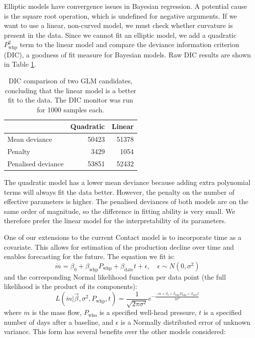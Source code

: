 \documentclass[a4paper, 12pt]{article}
\begin{document}
Elliptic models have convergence issues in Bayesian regression. A potential cause is the square root operation, which is undefined for negative arguments. If we want to use a linear, non-curved model, we must check whether curvature is present in the data. Since we cannot fit an elliptic model, we add a quadratic $P_\text{whp}^2$ term to the linear model and compare the deviance information criterion (DIC), a goodness of fit measure for Bayesian models. Raw DIC results are shown in Table \ref{tab:curvature}.

\begin{table}
\centering
\begin{tabular}{lrr}
  \hline
& Quadratic & Linear \\ 
  \hline
Mean deviance & 50423 & 51378 \\
Penalty & 3429 & 1054 \\
Penalised deviance & 53851 & 52432\\
   \hline
\end{tabular}
\caption{DIC comparison of two GLM candidates, concluding that the linear model is a better fit to the data. The DIC monitor was run for 1000 samples each.} 
\label{tab:curvature}
\end{table}

The quadratic model has a lower mean deviance because adding extra polynomial terms will always fit the data better. However, the penalty on the number of effective parameters is higher. The penalised deviances of both models are on the same order of magnitude, so the difference in fitting ability is very small. We therefore prefer the linear model for the interpretability of its parameters.

One of our extensions to the current Contact model is to incorporate time as a covariate. This allows for estimation of the production decline over time and enables forecasting for the future. The equation we fit is:
\begin{equation} \label{eq:linreg}
\dot{m} = \beta_0 + \beta_\text{whp}P_\text{whp} + \beta_\text{date}t + \epsilon,\quad \epsilon\sim N(0, \sigma^2)
\end{equation}
and the corresponding Normal likelihood function per data point (the full likelihood is the product of its components):
\begin{equation}
L\left( \dot{m} | \vec{\beta},\sigma^2,P_\text{whp},t \right) = \frac{1}{\sqrt{2\pi\sigma^2}} e^{-\frac{-\dot{m} + \beta_0 + \beta_\text{whp}P_\text{whp} + \beta_\text{date}t}{2\sigma^2}}
\end{equation}
where $\dot{m}$ is the mass flow, $P_\text{who}$ is a specified well-head pressure, $t$ is a specified number of days after a baseline, and $\epsilon$ is a Normally distributed error of unknown variance. This form has several benefits over the other models considered:
\end{document}
